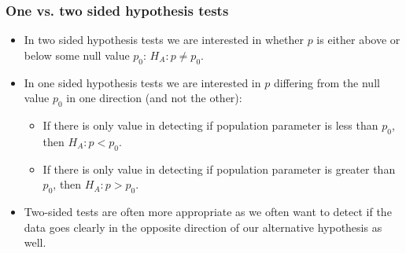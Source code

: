 \documentclass[notes,11pt, aspectratio=169]{beamer}
\begin{document}
\begin{frame}
\frametitle{One vs. two sided hypothesis tests}
 
\begin{itemize}
 
\item In two sided hypothesis tests we are interested in whether $p$ is either above or below some null value $p_0$: $H_A: p \ne p_0$.
 
\item In one sided hypothesis tests we are interested in $p$ differing from the null value $p_0$ in one direction (and not the other):
\begin{itemize}
\item If there is only value in detecting if population parameter is less than $p_0$, then $H_A: p < p_0$.
\item If there is only value in detecting if population parameter is greater than $p_0$, then $H_A: p > p_0$.
\end{itemize}

\item Two-sided tests are often more appropriate as we often want to detect if the data goes clearly in the opposite direction of our alternative hypothesis as well.

\end{itemize}

\end{frame}

 
\end{document}
